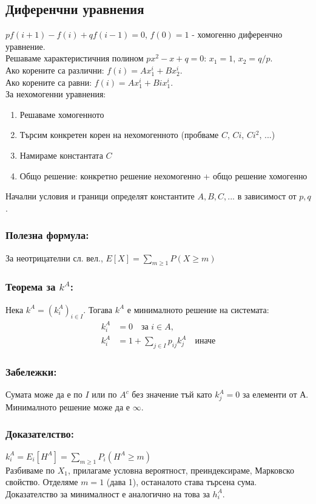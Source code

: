 \documentclass{article}
\begin{document}
\subsection{Диференчни уравнения}
$pf(i+1) - f(i) + qf(i-1) = 0$, $f(0) = 1$ - хомогенно диференчно уравнение. \\
Решаваме характеристичния полином $px^2 - x + q = 0$: $x_1 = 1$, $x_2 = q/p$. \\
Ако корените са различни: $f(i) = A x_1^i + B x_2^i$. \\
Ако корените са равни: $f(i) = A x_1^i + B i x_1^i$. \\

За нехомогенни уравнения:
\begin{enumerate}
\item Решаваме хомогенното
\item Търсим конкретен корен на нехомогенното (пробваме $C$, $Ci$, $Ci^2$, ...)
\item Намираме константата $C$
\item Общо решение: конкретно решение нехомогенно + общо решение хомогенно
\end{enumerate}

Начални условия и граници определят константите $A,B,C,...$ в зависимост от $p,q$.

\subsubsection*{Полезна формула:}
За неотрицателни сл. вел., $E[X] = \sum_{m \geq 1} P(X \geq m)$

\subsubsection*{Теорема за $k^A$:}
Нека $k^A = (k_i^A)_{i \in I}$. Тогава $k^A$ е минималното решение на системата:
\begin{align*}
k_i^A &= 0 \quad \text{за } i \in A, \\
k_i^A &= 1 + \sum_{j \in I} p_{ij} k_j^A \quad \text{иначе}
\end{align*}

\subsubsection*{Забележки:}
Сумата може да е по $I$ или по $A^c$ без значение тъй като $k_j^A=0$ за елементи от А. Минималното решение може да е $\infty$.

\subsubsection*{Доказателство:}
$k_i^A = E_i[H^A] = \sum_{m \geq 1} P_i(H^A \geq m)$ \\
Разбиваме по $X_1$, прилагаме условна вероятност, преиндексираме, Марковско свойство. 
Отделяме $m=1$ (дава 1), останалото става търсена сума. 
Доказателство за минималност е аналогично на това за $h_i^A$.
\end{document}
